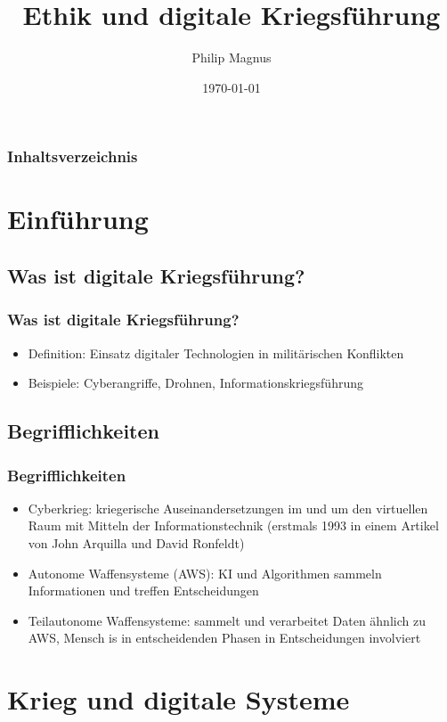 \documentclass[handout]{beamer}
\title{Ethik und digitale Kriegsführung}
\author{Philip Magnus}
\institute{FH Campus Wien}
\date{\today}
\begin{document}
\begin{frame}
    \titlepage
\end{frame}
\begin{frame}
    \frametitle{Inhaltsverzeichnis}
    \tableofcontents
\end{frame}

\section{Einführung}
\subsection{Was ist digitale Kriegsführung?}

\begin{frame}
    \frametitle{Was ist digitale Kriegsführung?}
    \begin{itemize}
        \item Definition: Einsatz digitaler Technologien in militärischen Konflikten
        \item Beispiele: Cyberangriffe, Drohnen, Informationskriegsführung 
    \end{itemize}
\end{frame}

\subsection{Begrifflichkeiten}

\begin{frame}
    \frametitle{Begrifflichkeiten}
    \begin{itemize}
        \item Cyberkrieg: kriegerische Auseinandersetzungen im und um den virtuellen Raum mit Mitteln der Informationstechnik (erstmals 1993 in einem Artikel von John Arquilla und David Ronfeldt) \cite{cyberkrieg}
        \item Autonome Waffensysteme (AWS): KI und Algorithmen sammeln Informationen und treffen Entscheidungen \cite{amnesty}
        \item Teilautonome Waffensysteme: sammelt und verarbeitet Daten ähnlich zu AWS, Mensch is in entscheidenden Phasen in Entscheidungen involviert
    \end{itemize}
\end{frame}

\section{Krieg und digitale Systeme}
\end{document}
